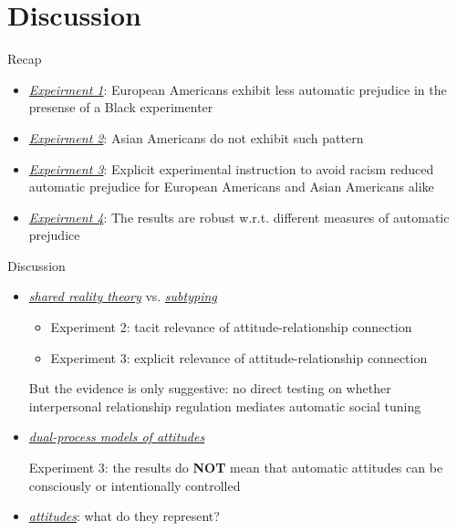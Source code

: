 \section{Discussion}

 \frame{\sectionpage}
    \begin{frame}{Recap}
        \begin{itemize}
            \item<+-> \textcolor{lightlavender}{\textit{\underline{Expeirment 1}}}: European Americans exhibit less automatic prejudice in the presense of a Black experimenter
            \item<+-> \textcolor{lightlavender}{\textit{\underline{Expeirment 2}}}: Asian Americans do not exhibit such pattern
            \item<+-> \textcolor{lightlavender}{\textit{\underline{Expeirment 3}}}: Explicit experimental instruction to avoid racism reduced automatic prejudice for European Americans and Asian Americans alike
            \item<+-> \textcolor{lightlavender}{\textit{\underline{Expeirment 4}}}: The results are robust w.r.t. different measures of automatic prejudice
        \end{itemize}
    \end{frame}

    \begin{frame}{Discussion}
        \begin{itemize}
            \item<+-> \textcolor{lightlavender}{\textit{\underline{shared reality theory}}} vs. \textcolor{lightlavender}{\textit{\underline{subtyping}}}
            \begin{itemize}
                \item Experiment 2: tacit relevance of attitude-relationship connection
                \item Experiment 3: explicit relevance of attitude-relationship connection
            \end{itemize}
            But the evidence is only suggestive: no direct testing on whether interpersonal relationship regulation mediates automatic social tuning
            \item<+-> \textcolor{lightlavender}{\textit{\underline{dual-process models of attitudes}}}
            
            Experiment 3: the results do \textbf{NOT} mean that automatic attitudes can be consciously or intentionally controlled %
            \item<+-> \textcolor{lightlavender}{\textit{\underline{attitudes}}}: what do they represent? %
        \end{itemize}
    \end{frame}